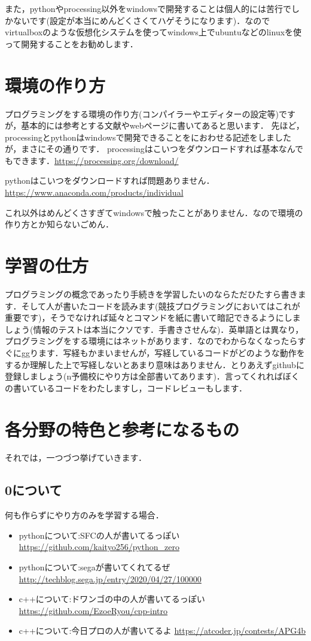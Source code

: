 \documentclass[10pt,twocolumn]{jsarticle}
\begin{document}
また，pythonやprocessing以外をwindowsで開発することは個人的には苦行でしかないです(設定が本当にめんどくさくてハゲそうになります)．なのでvirtualboxのような仮想化システムを使ってwindows上でubuntuなどのlinuxを使って開発することをお勧めします．

\section{環境の作り方}
プログラミングをする環境の作り方(コンパイラーやエディターの設定等)ですが，基本的には参考とする文献やwebページに書いてあると思います．
先ほど，processingとpythonはwindowsで開発できることをにおわせる記述をしましたが，まさにその通りです．
processingはこいつをダウンロードすれば基本なんでもできます．\url{https://processing.org/download/}

pythonはこいつをダウンロードすれば問題ありません．\url{https://www.anaconda.com/products/individual}

これ以外はめんどくさすぎてwindowsで触ったことがありません．なので環境の作り方とか知らないごめん．

\section{学習の仕方}
プログラミングの概念であったり手続きを学習したいのならただひたすら書きます．そして人が書いたコードを読みます(競技プログラミングにおいてはこれが重要です)，そうでなければ延々とコマンドを紙に書いて暗記できるようにしましょう(情報のテストは本当にクソです．手書きさせんな)．英単語とは異なり，プログラミングをする環境にはネットがあります．なのでわからなくなったらすぐにggります．写経もかまいませんが，写経しているコードがどのような動作をするか理解した上で写経しないとあまり意味はありません．とりあえずgithubに登録しましょう(n予備校にやり方は全部書いてあります)．言ってくれればぼくの書いているコードをわたしますし，コードレビューもします．

\section{各分野の特色と参考になるもの}
それでは，一つづつ挙げていきます．

\subsection{0について}
何も作らずにやり方のみを学習する場合．

\begin{itemize}
  \item pythonについて:SFCの人が書いてるっぽい \url{https://github.com/kaityo256/python_zero}

  \item pythonについて:segaが書いてくれてるぜ　\url{http://techblog.sega.jp/entry/2020/04/27/100000}

  \item c++について:ドワンゴの中の人が書いてるっぽい \url{https://github.com/EzoeRyou/cpp-intro}

  \item c++について:今日プロの人が書いてるよ \url{https://atcoder.jp/contests/APG4b}

\end{itemize}
\end{document}
